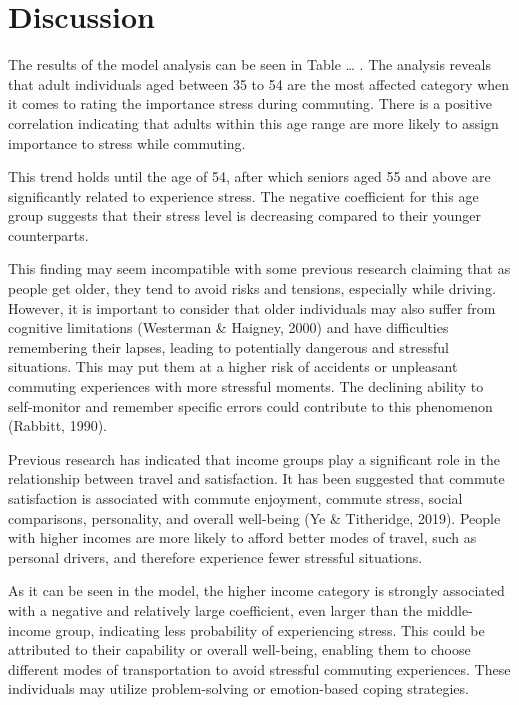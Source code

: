 \documentclass[
11pt, %
oneside, %
english, %
singlespacing, %
]{macthesis} %
\begin{document}
\hypertarget{discussion}{%
\section{Discussion}\label{discussion}}

The results of the model analysis can be seen in Table \ldots{} . The analysis reveals that adult individuals aged between 35 to 54 are the most affected category when it comes to rating the importance stress during commuting. There is a positive correlation indicating that adults within this age range are more likely to assign importance to stress while commuting.

This trend holds until the age of 54, after which seniors aged 55 and above are significantly related to experience stress. The negative coefficient for this age group suggests that their stress level is decreasing compared to their younger counterparts.

This finding may seem incompatible with some previous research claiming that as people get older, they tend to avoid risks and tensions, especially while driving. However, it is important to consider that older individuals may also suffer from cognitive limitations (Westerman \& Haigney, 2000) and have difficulties remembering their lapses, leading to potentially dangerous and stressful situations. This may put them at a higher risk of accidents or unpleasant commuting experiences with more stressful moments. The declining ability to self-monitor and remember specific errors could contribute to this phenomenon (Rabbitt, 1990).

Previous research has indicated that income groups play a significant role in the relationship between travel and satisfaction. It has been suggested that commute satisfaction is associated with commute enjoyment, commute stress, social comparisons, personality, and overall well-being (Ye \& Titheridge, 2019). People with higher incomes are more likely to afford better modes of travel, such as personal drivers, and therefore experience fewer stressful situations.

As it can be seen in the model, the higher income category is strongly associated with a negative and relatively large coefficient, even larger than the middle-income group, indicating less probability of experiencing stress. This could be attributed to their capability or overall well-being, enabling them to choose different modes of transportation to avoid stressful commuting experiences. These individuals may utilize problem-solving or emotion-based coping strategies.
\end{document}
